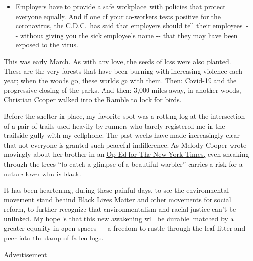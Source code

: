 \begin{itemize}
  \begin{itemize}
  \tightlist
  \item
    Employers have to provide
    \href{https://www.osha.gov/SLTC/covid-19/standards.html}{a safe
    workplace}~with policies that protect everyone equally.
    \href{https://www.nytimes3xbfgragh.onion/article/coronavirus-money-unemployment.html?action=click\&pgtype=Article\&state=default\&region=MAIN_CONTENT_3\&context=storylines_faq}{And
    if one of your co-workers tests positive for the coronavirus, the
    C.D.C.}~has said that
    \href{https://www.cdc.gov/coronavirus/2019-ncov/community/guidance-business-response.html}{employers
    should tell their employees}~-\/- without giving you the sick
    employee's name -\/- that they may have been exposed to the virus.
  \end{itemize}
\end{itemize}

This was early March. As with any love, the seeds of loss were also
planted. These are the very forests that have been burning with
increasing violence each year; when the woods go, these worlds go with
them. Then: Covid-19 and the progressive closing of the parks. And then:
3,000 miles away, in another woods,
\href{https://www.nytimes3xbfgragh.onion/2020/06/14/nyregion/central-park-amy-cooper-christian-racism.html}{Christian
Cooper walked into the Ramble to look for birds.}

Before the shelter-in-place, my favorite spot was a rotting log at the
intersection of a pair of trails used heavily by runners who barely
registered me in the trailside gully with my cellphone. The past weeks
have made increasingly clear that not everyone is granted such peaceful
indifference. As Melody Cooper wrote movingly about her brother in an
\href{https://www.nytimes3xbfgragh.onion/2020/05/31/opinion/chris-cooper-central-park.html}{Op-Ed
for The New York Times,} even sneaking through the trees ``to catch a
glimpse of a beautiful warbler'' carries a risk for a nature lover who
is black.

It has been heartening, during these painful days, to see the
environmental movement stand behind Black Lives Matter and other
movements for social reform, to further recognize that environmentalism
and racial justice can't be unlinked. My hope is that this new awakening
will be durable, matched by a greater equality in open spaces --- a
freedom to rustle through the leaf-litter and peer into the damp of
fallen logs.

Advertisement

